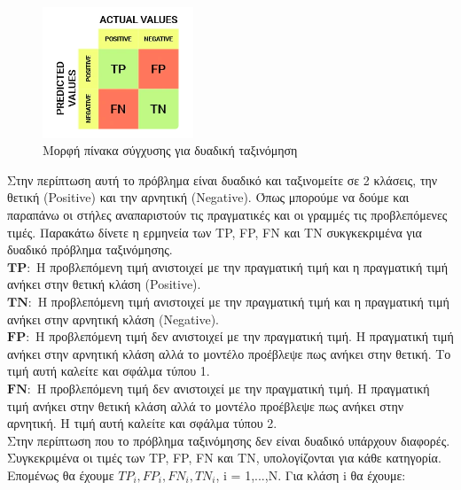 \documentclass[12pt]{article}
\numberwithin{equation}{section}
\begin{document}
\begin{figure}[h!]
  \centering
  \includegraphics[width=0.4\textwidth]{images/conf_matrix.png} %
  \caption{Μορφή πίνακα σύγχυσης για δυαδική ταξινόμηση}
  \label{figure 9}
\end{figure}

\noindent Στην περίπτωση αυτή το πρόβλημα είναι δυαδικό και ταξινομείτε σε 2 κλάσεις, την θετική (Positive) και την αρνητική (Negative). Όπως μπορούμε να δούμε και παραπάνω οι στήλες αναπαριστούν τις πραγματικές και οι γραμμές τις προβλεπόμενες τιμές. Παρακάτω δίνετε η ερμηνεία των TP, FP, FN και TN συκγκεκριμένα για δυαδικό πρόβλημα ταξινόμησης. \\

\noindent$\mathbf{TP: }$ Η προβλεπόμενη τιμή ανιστοιχεί με την πραγματική τιμή και η πραγματική τιμή ανήκει στην θετική κλάση (Positive). \\

\noindent$\mathbf{TΝ: }$ Η προβλεπόμενη τιμή ανιστοιχεί με την πραγματική τιμή και η πραγματική τιμή ανήκει στην αρνητική κλάση (Negative). \\

\noindent$\mathbf{FP: }$ Η προβλεπόμενη τιμή δεν ανιστοιχεί με την πραγματική τιμή. Η πραγματική τιμή ανήκει στην αρνητική κλάση αλλά το μοντέλο προέβλεψε πως ανήκει στην θετική. Το τιμή αυτή καλείτε και σφάλμα τύπου 1. \\

\noindent$\mathbf{FΝ: }$ Η προβλεπόμενη τιμή δεν ανιστοιχεί με την πραγματική τιμή. Η πραγματική τιμή ανήκει στην θετική κλάση αλλά το μοντέλο προέβλεψε πως ανήκει στην αρνητική. Η τιμή αυτή καλείτε και σφάλμα τύπου 2. \\

\noindent Στην περίπτωση που το πρόβλημα ταξινόμησης δεν είναι δυαδικό υπάρχουν διαφορές.  Συγκεκριμένα οι τιμές των TP, FP, FN και TN, υπολογίζονται για κάθε κατηγορία. Επομένως θα έχουμε \(TP_i, FP_i, FN_i, TN_i\), i = 1,...,N. Για κλάση i θα έχουμε: \\
\end{document}
